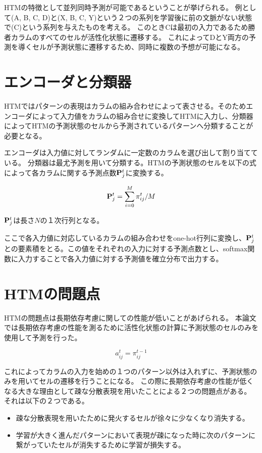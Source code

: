 HTMの特徴として並列同時予測が可能であるということが挙げられる。
例として(A, B, C, D)と(X, B, C, Y)という２つの系列を学習後に前の文脈がない状態で(C)という系列を与えたものを考える。
このときCは最初の入力であるため勝者カラムのすべてのセルが活性化状態に遷移する。
これによってDとY両方の予測を導くセルが予測状態に遷移するため、同時に複数の予想が可能になる。

\newpage
\section{エンコーダと分類器}
HTMではパターンの表現はカラムの組み合わせによって表させる。そのためエンコーダによって入力値をカラムの組み合せに変換してHTMに入力し、分類器によってHTMの予測状態のセルから予測されているパターンへ分類することが必要となる。

エンコーダは入力値に対してランダムに一定数のカラムを選び出して割り当てている。
分類器は最尤予測を用いて分類する。HTMの予測状態のセルを以下の式によって各カラムに関する予測点数${\bf P}^t_j$に変換する。

\begin{equation}
  {\bf P}^t_j = \sum^{M}_{i=0} \pi^t_{ij} / M
\end{equation}

${\bf P}^t_j$は長さ$N$の１次行列となる。

ここで各入力値に対応しているカラムの組み合わせをone-hot行列に変換し、${\bf P}^t_j$との要素積をとる。この値をそれぞれの入力に対する予測点数とし、softmax関数に入力することで各入力値に対する予測値を確立分布で出力する。

\section{HTMの問題点}
HTMの問題点は長期依存考慮に関しての性能が低いことがあげられる。
本論文では長期依存考慮の性能を測るために活性化状態の計算に予測状態のセルのみを使用して予測を行った。

\begin{equation}
  a^t_{ij} = \pi^{t-1}_{ij}
\end{equation}

これによってカラムの入力を始めの１つのパターン以外は入れずに、予測状態のみを用いてセルの遷移を行うことになる。
この際に長期依存考慮の性能が低くなる大きな理由として疎な分散表現を用いたことによる２つの問題点がある。
それは以下の２つである。

\begin{itemize}
  \item 疎な分散表現を用いたために発火するセルが徐々に少なくなり消失する。
  \item 学習が大きく進んだパターンにおいて表現が疎になった時に次のパターンに繋がっていたセルが消失するために学習が損失する。
\end{itemize}

